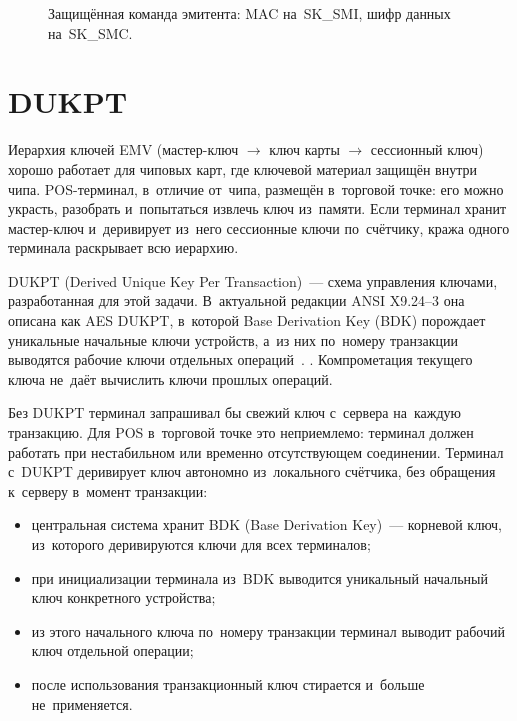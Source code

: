 \begin{figure}[tbp]
  \centering
  \caption{Защищённая команда эмитента: MAC на~SK\_SMI, шифр данных на~SK\_SMC.}\label{fig:secure-messaging}
\end{figure}

\FloatBarrier
\section{DUKPT}\label{sec:crypto-dukpt}

Иерархия ключей EMV (мастер-ключ $\to$ ключ карты $\to$ сессионный ключ) хорошо
работает для чиповых карт, где ключевой материал защищён внутри чипа.
POS-терминал, в~отличие от~чипа, размещён в~торговой точке: его можно украсть,
разобрать и~попытаться извлечь ключ из~памяти. Если терминал хранит
мастер-ключ и~деривирует из~него сессионные ключи по~счётчику, кража одного
терминала раскрывает всю иерархию.

DUKPT (Derived Unique Key Per Transaction)~--- схема управления ключами,
разработанная для этой задачи. В~актуальной редакции ANSI X9.24--3 она описана
как AES DUKPT, в~которой Base Derivation Key (BDK) порождает уникальные начальные
ключи устройств, а~из них по~номеру транзакции выводятся рабочие ключи
отдельных операций~\cite{ansi-x9-24-3}. . Компрометация текущего ключа не~даёт
вычислить ключи прошлых операций.

Без DUKPT терминал запрашивал бы свежий ключ с~сервера на~каждую транзакцию.
Для POS в~торговой точке это неприемлемо: терминал должен работать при
нестабильном или временно отсутствующем соединении. Терминал с~DUKPT деривирует
ключ автономно из~локального счётчика, без обращения к~серверу в~момент
транзакции:

\begin{itemize}
  \item центральная система хранит BDK (Base Derivation Key)~--- корневой ключ,
    из~которого деривируются ключи для всех терминалов;
  \item при инициализации терминала из~BDK выводится уникальный начальный ключ
    конкретного устройства;
  \item из этого начального ключа по~номеру транзакции терминал выводит рабочий
    ключ отдельной операции;
  \item после использования транзакционный ключ стирается и~больше
    не~применяется.
\end{itemize}

